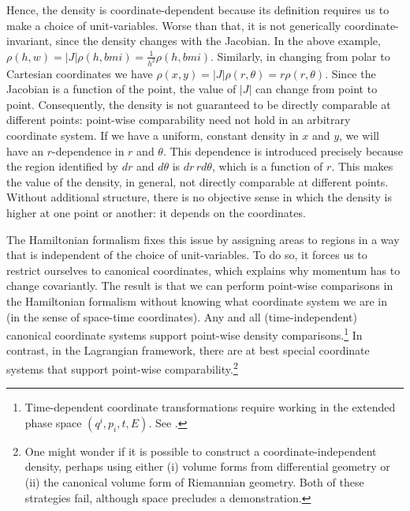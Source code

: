 \documentclass[12pt, english, twoside]{article} %
\begin{document}
Hence, the density is coordinate-dependent because its definition requires us to make a choice of unit-variables. Worse than that, it is not generically coordinate-invariant, since the density changes with the Jacobian. In the above example, $\rho(h,w) = |J| \rho(h, bmi) = \frac{1}{h^2} \rho(h, bmi)$. Similarly, in changing from polar to Cartesian coordinates we have $\rho(x,y) = |J| \rho(r, \theta) = r \rho(r, \theta)$. Since the Jacobian is a function of the point, the value of $|J|$ can change from point to point. Consequently, the density is not guaranteed to be directly comparable at different points: point-wise comparability need not hold in an arbitrary coordinate system. If we have a uniform, constant density in $x$ and $y$, we will have an $r$-dependence in $r$ and $\theta$. This dependence is introduced precisely because the region identified by $dr$ and $d\theta$ is $dr \,r d\theta$, which is a function of $r$. This makes the value of the density, in general, not directly comparable at different points. Without additional structure, there is no objective sense in which the density is higher at one point or another: it depends on the coordinates.


The Hamiltonian formalism fixes this issue by assigning areas to regions in a way that is independent of the choice of unit-variables. To do so, it forces us to restrict ourselves to canonical coordinates, which explains why momentum has to change covariantly. The result is that we can perform point-wise comparisons in the Hamiltonian formalism without knowing what coordinate system we are in (in the sense of space-time coordinates). Any and all (time-independent) canonical coordinate systems support point-wise density comparisons.\footnote{Time-dependent coordinate transformations require working in the extended phase space $(q^i, p_i, t, E)$. See \textcites[]{Struckmeier}.} In contrast, in the Lagrangian framework, there are at best special coordinate systems that support point-wise comparability.\footnote{One might wonder if it is possible to construct a coordinate-independent density, perhaps using either (i) volume forms from differential geometry or (ii) the canonical volume form of Riemannian geometry. Both of these strategies fail, although space precludes a demonstration.}
\end{document}
